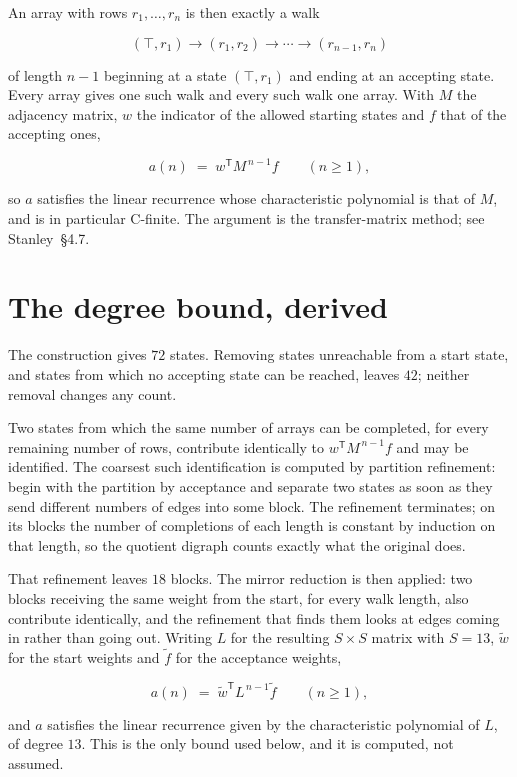 \documentclass[11pt]{article}
\theoremstyle{definition}
\begin{document}
An array with rows $r_1,\dots,r_n$ is then exactly a walk

\[(\top,r_1) \to (r_1,r_2) \to \cdots \to (r_{n-1},r_n)\]

of length $n-1$ beginning at a state $(\top,r_1)$ and ending at an accepting state. Every array gives one such walk and every such walk one array. With $M$ the adjacency matrix, $w$ the indicator of the allowed starting states and $f$ that of the accepting ones,

\[a(n) \;=\; w^{\mathsf T} M^{\,n-1} f \qquad (n \ge 1),\]

so $a$ satisfies the linear recurrence whose characteristic polynomial is that of $M$, and is in particular C-finite. The argument is the transfer-matrix method; see Stanley~\S4.7.

\section{The degree bound, derived}

The construction gives $72$ states. Removing states unreachable from a start state, and states from which no accepting state can be reached, leaves $42$; neither removal changes any count.

Two states from which the same number of arrays can be completed, for every remaining number of rows, contribute identically to $w^{\mathsf T}M^{\,n-1}f$ and may be identified. The coarsest such identification is computed by partition refinement: begin with the partition by acceptance and separate two states as soon as they send different numbers of edges into some block. The refinement terminates; on its blocks the number of completions of each length is constant by induction on that length, so the quotient digraph counts exactly what the original does.

That refinement leaves $18$ blocks. The mirror reduction is then applied: two blocks receiving the same weight from the start, for every walk length, also contribute identically, and the refinement that finds them looks at edges coming in rather than going out. Writing $L$ for the resulting $S \times S$ matrix with $S = 13$, $\tilde w$ for the start weights and $\tilde f$ for the acceptance weights,

\[a(n) \;=\; \tilde w^{\mathsf T} L^{\,n-1} \tilde f \qquad (n \ge 1),\]

and $a$ satisfies the linear recurrence given by the characteristic polynomial of $L$, of degree $13$. This is the only bound used below, and it is computed, not assumed.
\end{document}
